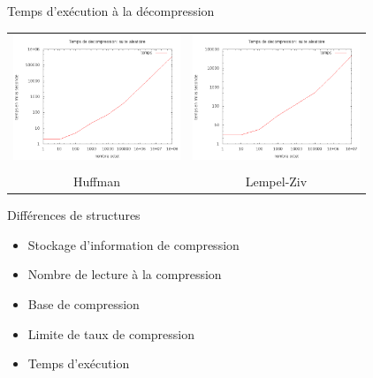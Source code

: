 \documentclass[french]{beamer}
\begin{document}
\begin{frame}{Temps d'exécution à la décompression}
	\begin{center}
	
\begin{tabular}{c| c}
	\includegraphics[width=5cm]{tempsDhA.png} & 
	\includegraphics[width=5cm]{tempsDlzA.png}\\  &  \\ 
	Huffman & Lempel-Ziv
	\end{tabular}	
	\end{center}
\end{frame}

\begin{frame}{Différences de structures}
	\begin{center}
	 \begin{itemize}
		\item<1-5> Stockage d'information de compression
		\item<2-5> Nombre de lecture à la compression
		\item<3-5> Base de compression 
		\item<4-5> Limite de taux de compression	
		\item<5> Temps d’exécution  
	 
	 \end{itemize}
	\end{center}
\end{frame}
\end{document}
